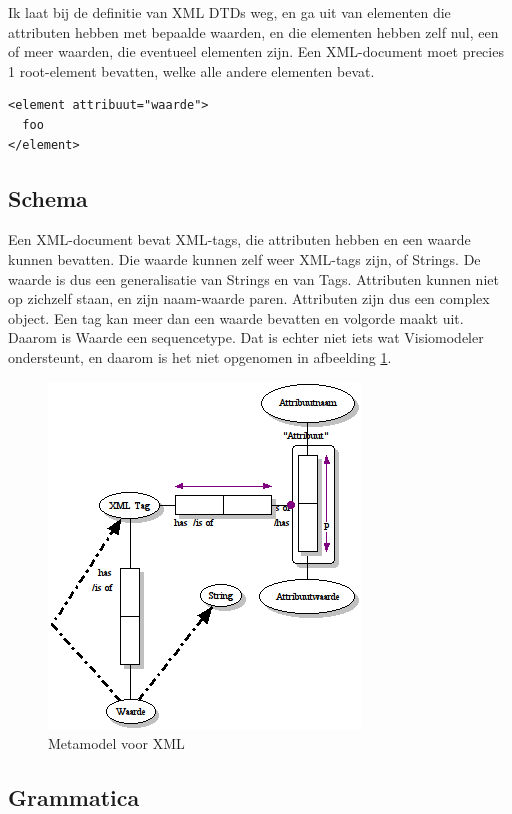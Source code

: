 \documentclass[10pt]{article}
\begin{document}
Ik laat bij de definitie van XML DTDs weg, en ga uit van elementen die
attributen hebben met bepaalde waarden, en die elementen hebben zelf nul, een
of meer waarden, die eventueel elementen zijn. Een XML-document moet precies
1 root-element bevatten, welke alle andere elementen bevat.

\begin{verbatim}
<element attribuut="waarde">
  foo
</element>
\end{verbatim} 

\subsection{Schema}

Een XML-document bevat XML-tags, die attributen hebben en een waarde kunnen 
bevatten. Die waarde kunnen zelf weer XML-tags zijn, of Strings. De waarde
is dus een generalisatie van Strings en van Tags. Attributen kunnen niet
op zichzelf staan, en zijn naam-waarde paren. Attributen zijn dus een complex
object. Een tag kan meer dan een waarde bevatten en volgorde maakt uit. Daarom
is Waarde een sequencetype. Dat is echter niet iets wat Visiomodeler ondersteunt,
en daarom is het niet opgenomen in afbeelding \ref{fig:xmlmodel}.

\begin{figure}[htpb]
  \centering
  \includegraphics[scale=0.8]{xml.png}
  \caption{Metamodel voor XML}
  \label{fig:xmlmodel}
\end{figure}

\subsection{Grammatica}
\end{document}
